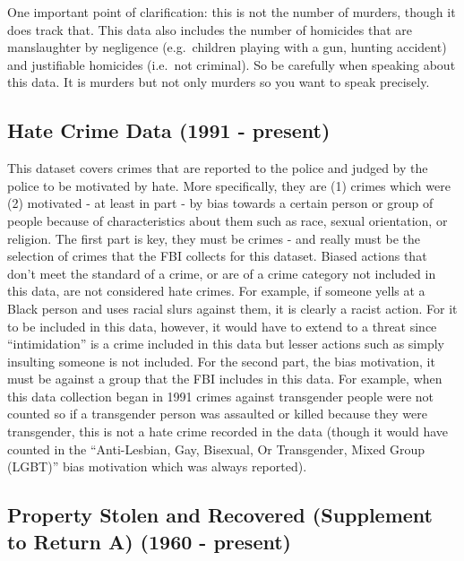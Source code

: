 \documentclass[
  12pt,
  openany]{book}
\begin{document}
One important point of clarification: this is not the number of murders, though it does track that. This data also includes the number of homicides that are manslaughter by negligence (e.g.~children playing with a gun, hunting accident) and justifiable homicides (i.e.~not criminal). So be carefully when speaking about this data. It is murders but not only murders so you want to speak precisely.

\subsection{Hate Crime Data (1991 - present)}\label{hate-crime-data-1991---present}

This dataset covers crimes that are reported to the police and judged by the police to be motivated by hate. More specifically, they are (1) crimes which were (2) motivated - at least in part - by bias towards a certain person or group of people because of characteristics about them such as race, sexual orientation, or religion. The first part is key, they must be crimes - and really must be the selection of crimes that the FBI collects for this dataset. Biased actions that don't meet the standard of a crime, or are of a crime category not included in this data, are not considered hate crimes. For example, if someone yells at a Black person and uses racial slurs against them, it is clearly a racist action. For it to be included in this data, however, it would have to extend to a threat since ``intimidation'' is a crime included in this data but lesser actions such as simply insulting someone is not included. For the second part, the bias motivation, it must be against a group that the FBI includes in this data. For example, when this data collection began in 1991 crimes against transgender people were not counted so if a transgender person was assaulted or killed because they were transgender, this is not a hate crime recorded in the data (though it would have counted in the ``Anti-Lesbian, Gay, Bisexual, Or Transgender, Mixed Group (LGBT)'' bias motivation which was always reported).

\subsection{Property Stolen and Recovered (Supplement to Return A) (1960 - present)}\label{property-stolen-and-recovered-supplement-to-return-a-1960---present}
\end{document}

